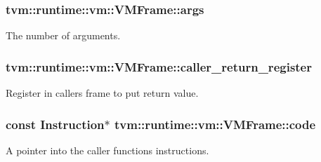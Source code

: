 \subsubsection[{\texorpdfstring{args}{args}}]{ tvm\+::runtime\+::vm\+::\+V\+M\+Frame\+::args}\hypertarget{structtvm_1_1runtime_1_1vm_1_1VMFrame_a189d59efcb86fa14dc486c2852a5f01b}{}\label{structtvm_1_1runtime_1_1vm_1_1VMFrame_a189d59efcb86fa14dc486c2852a5f01b}


The number of arguments. 

\subsubsection[{\texorpdfstring{caller\+\_\+return\+\_\+register}{caller_return_register}}]{ tvm\+::runtime\+::vm\+::\+V\+M\+Frame\+::caller\+\_\+return\+\_\+register}\hypertarget{structtvm_1_1runtime_1_1vm_1_1VMFrame_a2f6c425a89ee6872ead9bc71ab87fdd1}{}\label{structtvm_1_1runtime_1_1vm_1_1VMFrame_a2f6c425a89ee6872ead9bc71ab87fdd1}


Register in caller\textquotesingle{}s frame to put return value. 

\subsubsection[{\texorpdfstring{code}{code}}]{\setlength{\rightskip}{0pt plus 5cm}const {\bf Instruction}$\ast$ tvm\+::runtime\+::vm\+::\+V\+M\+Frame\+::code}\hypertarget{structtvm_1_1runtime_1_1vm_1_1VMFrame_a6b1467a43cd8cb5123b08bbb4b39f428}{}\label{structtvm_1_1runtime_1_1vm_1_1VMFrame_a6b1467a43cd8cb5123b08bbb4b39f428}


A pointer into the caller function\textquotesingle{}s instructions. 

